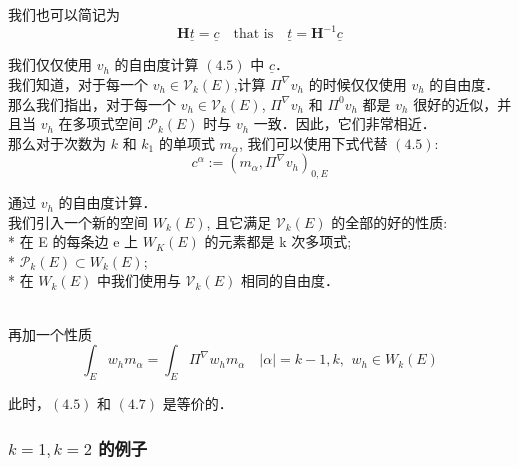 我们也可以简记为 \\
\begin{equation}
\mathbf{H}\underline{t} = \underline{c}\quad \text{that is} \quad \underline{t} = \mathbf{H}^{-1}\underline{c}
\end{equation}

我们仅仅使用 $v_h$ 的自由度计算 $(4.5)$ 中 $\underline{c}$．\\

我们知道，对于每一个 $v_h \in \mathcal{V}_k(E)$,计算 $\Pi^{\nabla}v_h$ 的时候仅仅使用 $v_h$ 的自由度．\\

那么我们指出，对于每一个 $v_h \in \mathcal{V}_k(E)$, $\Pi^{\nabla}v_h$ 和 $\Pi^{0}v_h$ 都是 $v_h$ 很好的近似，并且当 $v_h$ 在多项式空间 $\mathcal{P}_{k}(E)$ 时与 $v_h$ 一致．因此，它们非常相近．\\

那么对于次数为 $k$ 和 $k_1$ 的单项式 $m_{\alpha}$, 我们可以使用下式代替 $(4.5)$: \\
\begin{equation}
c^{\alpha}:= (m_{\alpha},\Pi^{\nabla}v_h)_{0,E}
\end{equation}

通过 $v_h$ 的自由度计算．\\

我们引入一个新的空间 $W_k(E)$, 且它满足 $\mathcal{V}_k(E)$ 的全部的好的性质: \\

* 在 E 的每条边 e 上 $W_K(E)$ 的元素都是 k 次多项式;  \\

* $\mathcal {P}_k(E)\subset W_k(E)$;  \\

* 在 $W_k(E)$ 中我们使用与 $\mathcal{V}_k(E)$ 相同的自由度．　\\　

再加一个性质  \\
\begin{equation}
\int_{E} w_hm_{\alpha} = \int_{E}\Pi^{\nabla} w_h m_{\alpha}\quad |\alpha| = k-1,k,\,\ w_h \in W_k(E)
\end{equation}

此时，$(4.5)$ 和 $(4.7)$ 是等价的．\\

\subsubsection{ $k = 1, k = 2$ 的例子}

